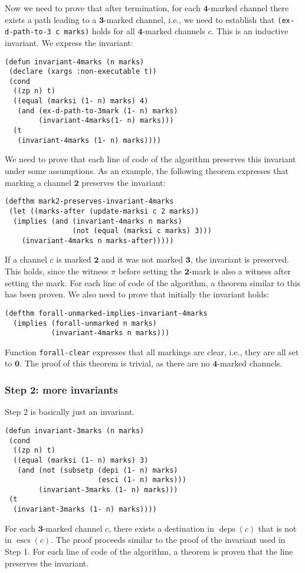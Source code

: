 \documentclass[submission,copyright]{eptcs}
\DeclareMathOperator{\escs}{escs}
\DeclareMathOperator{\deps}{deps}
\begin{document}
Now we need to prove that after termination, for each $\mathbf{4}$-marked channel there exists a path leading to a $\mathbf{3}$-marked channel, i.e., we need to establish that {\tt (ex-d-path-to-3 c marks)} holds for all $\mathbf{4}$-marked channels $c$. This is an inductive invariant.
We express the invariant:
\begin{verbatim}
(defun invariant-4marks (n marks)
 (declare (xargs :non-executable t)) 
 (cond
  ((zp n) t)
  ((equal (marksi (1- n) marks) 4)
   (and (ex-d-path-to-3mark (1- n) marks)
        (invariant-4marks(1- n) marks)))
  (t
   (invariant-4marks (1- n) marks))))
\end{verbatim}
We need to prove that each line of code of the algorithm preserves this invariant under some assumptions. As an example, the following theorem expresses that marking a channel $\mathbf{2}$ preserves the invariant:
\begin{verbatim}
(defthm mark2-preserves-invariant-4marks
 (let ((marks-after (update-marksi c 2 marks))
  (implies (and (invariant-4marks n marks)
                (not (equal (marksi c marks) 3)))
    (invariant-4marks n marks-after)))))
\end{verbatim}
If a channel $c$ is marked $\mathbf{2}$ and it was not marked $\mathbf{3}$, the invariant is preserved. This holds, since the witness $\pi$ before setting the $\mathbf{2}$-mark is also a witness after setting the mark. 
For each line of code of the algorithm, a theorem similar to this has been proven. We also need to prove that initially the invariant holds:
\begin{verbatim}
(defthm forall-unmarked-implies-invariant-4marks
  (implies (forall-unmarked n marks)
           (invariant-4marks n marks)))
\end{verbatim}
Function {\tt forall-clear} expresses that all markings are clear, i.e., they are all set to $\mathbf{0}$. The proof of this theorem is trivial, as there are no $\mathbf{4}$-marked channels.

\subsubsection{Step 2: more invariants}
Step 2 is basically just an invariant. 
\begin{verbatim}
(defun invariant-3marks (n marks)
 (cond
  ((zp n) t)
  ((equal (marksi (1- n) marks) 3)
   (and (not (subsetp (depi (1- n) marks)
                      (esci (1- n) marks)))
        (invariant-3marks (1- n) marks)))
 (t
  (invariant-3marks (1- n) marks))))
\end{verbatim}
For each $\mathbf{3}$-marked channel $c$, there exists a destination in $\deps(c)$ that is not in $\escs(c)$.
The proof proceeds similar to the proof of the invariant used in Step 1. For each line of code of the algorithm, a theorem is proven that the line preserves the invariant.
\end{document}
